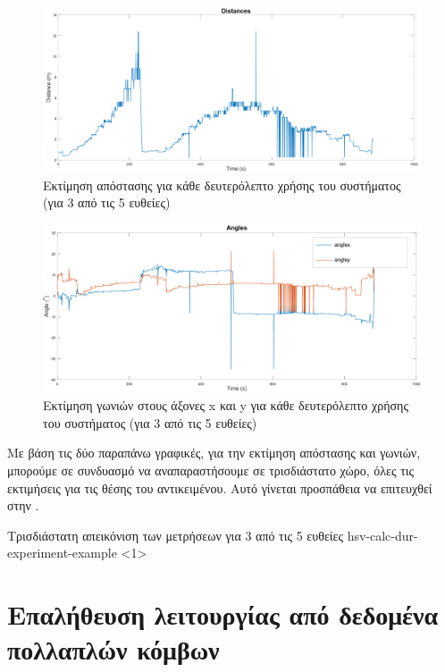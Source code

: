\begin{figure}[H]
  \centering
  \includegraphics[width=\linewidth]{../Images/Experiments-Results/raspberry-exp-dist.png}
  \decoRule
  \caption[Εκτίμηση απόστασης για κάθε δευτερόλεπτο χρήσης του συστήματος]{Εκτίμηση απόστασης για κάθε δευτερόλεπτο χρήσης του συστήματος (για 3 από τις 5 ευθείες)}
  \label{fig:dist-experiment-example}
\end{figure}


\begin{figure}[H]
  \centering
  \includegraphics[width=\linewidth]{../Images/Experiments-Results/raspberry-exp-angles.png}
  \decoRule
  \caption[Εκτίμηση γωνιών στους άξονες x και y για κάθε δευτερόλεπτο χρήσης του συστήματος]{Εκτίμηση γωνιών στους άξονες x και y για κάθε δευτερόλεπτο χρήσης του συστήματος (για 3 από τις 5 ευθείες)}
  \label{fig:angles-usage-experiment-example}
\end{figure}

Με βάση τις δύο παραπάνω γραφικές, για την εκτίμηση απόστασης και γωνιών, μπορούμε σε συνδυασμό να αναπαραστήσουμε σε τρισδιάστατο χώρο, όλες τις εκτιμήσεις για τις θέσης του αντικειμένου. Αυτό γίνεται προσπάθεια να επιτευχθεί στην .

{Τρισδιάστατη απεικόνιση των μετρήσεων για 3 από τις 5 ευθείες}%
{hsv-calc-dur-experiment-example}%
<1>

\section{Επαλήθευση λειτουργίας από δεδομένα πολλαπλών κόμβων}

